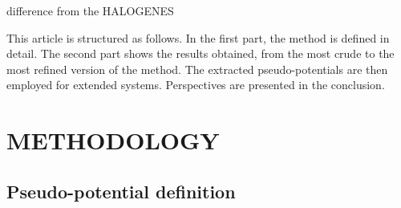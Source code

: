 \documentclass[12pt]{article}
\begin{document}

difference from the HALOGENES

This article is structured as follows.
In the first part, the method is defined in detail.
The second part shows the results obtained, from the most crude to the most refined
version of the method.
The extracted pseudo-potentials are then employed for extended systems.
Perspectives are presented in the conclusion.

\section*{\sffamily \Large METHODOLOGY}

\subsection*{\sffamily \large Pseudo-potential definition}
\end{document}
